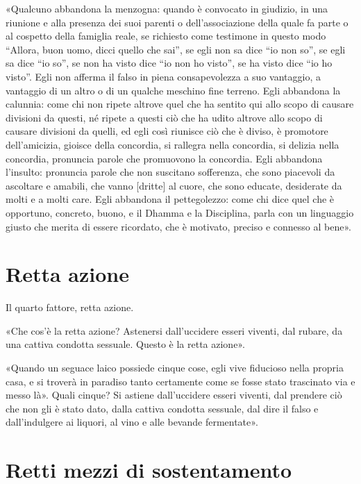 «Qualcuno abbandona la menzogna: quando è convocato in giudizio, in una riunione
e alla presenza dei suoi parenti o dell’associazione della quale fa parte o al
cospetto della famiglia reale, se richiesto come testimone in questo modo
“Allora, buon uomo, dicci quello che sai”, se egli non sa dice “io non so”, se
egli sa dice “io so”, se non ha visto dice “io non ho visto”, se ha visto dice
“io ho visto”. Egli non afferma il falso in piena consapevolezza a suo
vantaggio, a vantaggio di un altro o di un qualche meschino fine terreno. Egli
abbandona la calunnia: come chi non ripete altrove quel che ha sentito qui allo
scopo di causare divisioni da questi, né ripete a questi ciò che ha udito
altrove allo scopo di causare divisioni da quelli, ed egli così riunisce ciò che
è diviso, è promotore dell’amicizia, gioisce della concordia, si rallegra nella
concordia, si delizia nella concordia, pronuncia parole che promuovono la
concordia. Egli abbandona l’insulto: pronuncia parole che non suscitano
sofferenza, che sono piacevoli da ascoltare e amabili, che vanno [dritte] al
cuore, che sono educate, desiderate da molti e a molti care. Egli abbandona il
pettegolezzo: come chi dice quel che è opportuno, concreto, buono, e il Dhamma e
la Disciplina, parla con un linguaggio giusto che merita di essere ricordato,
che è motivato, preciso e connesso al bene».


\section*{Retta azione}

 Il quarto fattore, retta azione.

 «Che cos’è la retta azione? Astenersi dall’uccidere esseri
viventi, dal rubare, da una cattiva condotta sessuale. Questo è la retta
azione».


«Quando un seguace laico possiede cinque cose, egli vive fiducioso nella propria
casa, e si troverà in paradiso tanto certamente come se fosse stato trascinato
via e messo là». Quali cinque? Si astiene dall’uccidere esseri viventi, dal
prendere ciò che non gli è stato dato, dalla cattiva condotta sessuale, dal dire
il falso e dall’indulgere ai liquori, al vino e alle bevande fermentate».


\section*{Retti mezzi di sostentamento}

